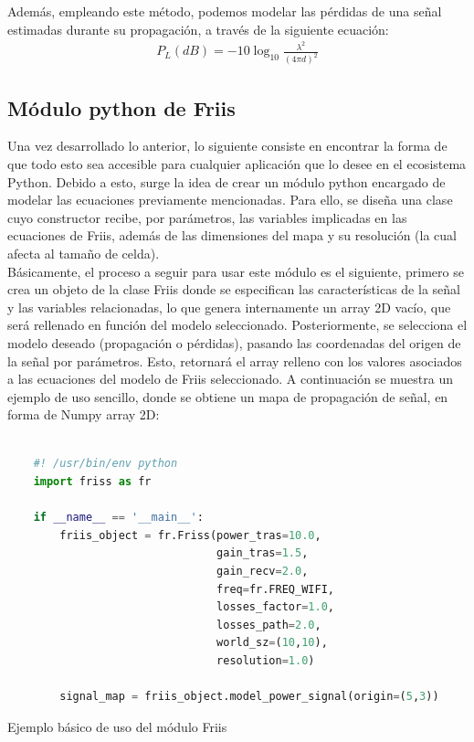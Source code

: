 Además, empleando este método, podemos modelar las pérdidas de una señal estimadas durante su propagación, a través de la siguiente ecuación:\\

\begin{align}
    P_L(dB) = -10 \log_{10} \frac{\lambda^2}{(4 \pi d)^2}
\end{align}

\subsection{Módulo python de Friis}
\label{subsec:friis-module}

Una vez desarrollado lo anterior, lo siguiente consiste en encontrar la forma de que todo esto sea accesible para cualquier aplicación que lo desee en el ecosistema Python. Debido a esto, surge la idea de crear un módulo python encargado de modelar las ecuaciones previamente mencionadas. Para ello, se diseña una clase cuyo constructor recibe, por parámetros, las variables implicadas en las ecuaciones de Friis, además de las dimensiones del mapa y su resolución (la cual afecta al tamaño de celda).\\

Básicamente, el proceso a seguir para usar este módulo es el siguiente, primero se crea un objeto de la clase Friis donde se especifican las características de la señal y las variables relacionadas, lo que genera internamente un array 2D vacío, que será rellenado en función del modelo seleccionado. Posteriormente, se selecciona el modelo deseado (propagación o pérdidas), pasando las coordenadas del origen de la señal por parámetros. Esto, retornará el array relleno con los valores asociados a las ecuaciones del modelo de Friis seleccionado. A continuación se muestra un ejemplo de uso sencillo, donde se obtiene un mapa de propagación de señal, en forma de Numpy array 2D:

\begin{code}[H]
    \begin{lstlisting}[language=Python]

    #! /usr/bin/env python
    import friss as fr

    if __name__ == '__main__':
        friis_object = fr.Friss(power_tras=10.0,
                                gain_tras=1.5,
                                gain_recv=2.0,
                                freq=fr.FREQ_WIFI,
                                losses_factor=1.0,
                                losses_path=2.0,
                                world_sz=(10,10),
                                resolution=1.0)

        signal_map = friis_object.model_power_signal(origin=(5,3))

\end{lstlisting}
\caption[Ejemplo básico de uso del módulo Friis]{Ejemplo básico de uso del módulo Friis}
\label{cod:friis_basics}
\end{code}

